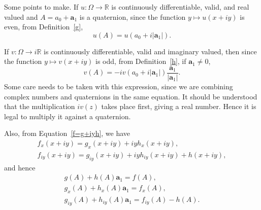 \documentclass[12pt,reqno]{amsart}
\begin{document}
Some points to make.  If $u:\Omega\to\mathbb R$ is continuously differentiable, valid, and real valued and $A = a_0 + \bm a_1$ is a quaternion, since the function $y \mapsto u(x + iy)$ is even, from Definition~\eqref{g},
\begin{equation}
u(A) = u(a_0 + i |\bm a_1|).
\end{equation}

If $v:\Omega\to i\mathbb R$ is continuously differentiable, valid and imaginary valued, then since the function $y \mapsto v(x + iy)$ is odd, from Definition~\eqref{h}, if $\bm a_1 \ne 0$,
\begin{equation}
v(A) = -i v(a_0 + i |\bm a_1|) \frac{\bm a_1}{|\bm a_1|}.
\end{equation}
Some care needs to be taken with this expression, since we are combining complex numbers and quaternions in the same equation.  It should be understood that the multiplication $iv(z)$ takes place first, giving a real number.  Hence it is legal to multiply it against a quaternion.

Also, from Equation~\eqref{f=g+iyh}, we have
\begin{gather}
f_x(x+iy) = g_x(x+iy) + i y h_{x}(x+iy), \\
f_{iy}(x+iy) = g_{iy}(x+iy) + i y h_{iy}(x+iy) + h(x+iy),
\end{gather}
and hence
\begin{gather}
g(A) + h(A) \bm a_1 = f(A), \\
g_x(A) + h_x(A) \bm a_1 = f_x(A), \\
g_{iy}(A) + h_{iy}(A) \bm a_1 = f_{iy}(A) - h(A).
\end{gather}
\end{document}
